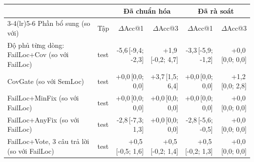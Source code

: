 \begin{tabular}{llrrrr}
\toprule
 & & \multicolumn{2}{c}{Đã chuẩn hóa} & \multicolumn{2}{c}{Đã rà soát} \\
\cmidrule(lr){3-4}\cmidrule(lr){5-6}
Phần bổ sung (so với) & Tập & $\Delta$Acc@1 & $\Delta$Acc@3 & $\Delta$Acc@1 & $\Delta$Acc@3 \\
\midrule
Độ phủ từng dòng: FailLoc+Cov (so với FailLoc) & test & -5,6{\scriptsize\,[-9,4; -2,3]} & +1,9{\scriptsize\,[-0,2; 4,7]} & -3,3{\scriptsize\,[-5,9; -1,2]} & +0,0{\scriptsize\,[0,0; 0,0]} \\
CovGate (so với SemLoc) & test & +0,0{\scriptsize\,[0,0; 0,0]} & +3,7{\scriptsize\,[1,5; 6,4]} & +0,0{\scriptsize\,[0,0; 0,0]} & +1,2{\scriptsize\,[0,0; 2,8]} \\
FailLoc+MinFix (so với FailLoc) & test & +0,0{\scriptsize\,[0,0; 0,0]} & +0,0{\scriptsize\,[0,0; 0,0]} & +0,0{\scriptsize\,[0,0; 0,0]} & +0,0{\scriptsize\,[0,0; 0,0]} \\
FailLoc+AnyFix (so với FailLoc) & test & -2,8{\scriptsize\,[-7,3; 1,3]} & +0,0{\scriptsize\,[0,0; 0,0]} & -2,8{\scriptsize\,[-5,6; -0,5]} & +0,0{\scriptsize\,[0,0; 0,0]} \\
FailLoc+Vote, 3 câu trả lời (so với FailLoc) & test & +0,5{\scriptsize\,[-0,5; 1,6]} & +0,5{\scriptsize\,[-0,2; 1,4]} & +0,5{\scriptsize\,[-0,2; 1,3]} & +0,0{\scriptsize\,[0,0; 0,0]} \\
\bottomrule
\end{tabular}
